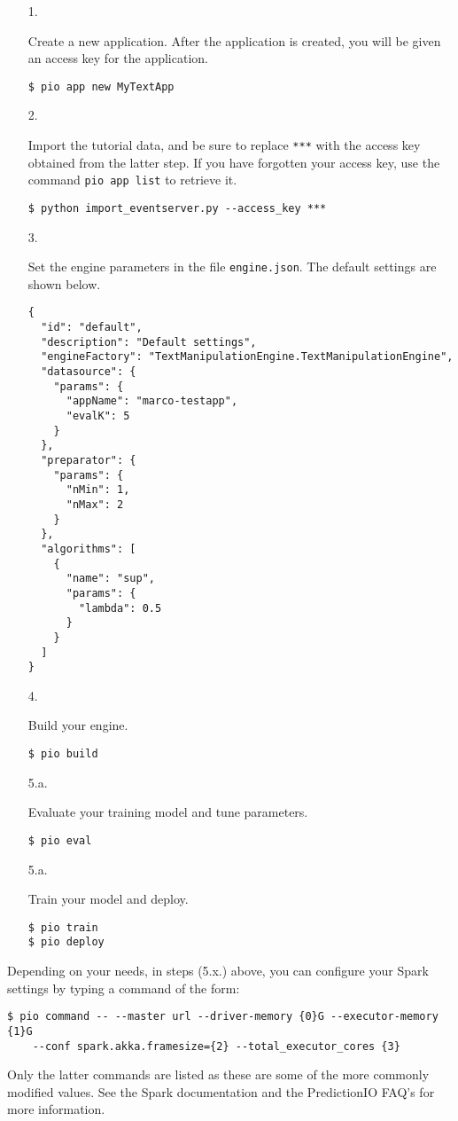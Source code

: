 \documentclass[a4paper,12pt]{article}
\renewcommand{\tt}[1]{\texttt{#1}}
\newcommand{\3}{\left}
\newcommand{\4}{\right}
\renewcommand{\-}[1]{{}^{-#1}}
\begin{document}
\begin{itemize}
\item[1.]{Create a new application. After the application is created, you will be given an access key for the application.
\begin{verbatim}
$ pio app new MyTextApp
\end{verbatim}}

\item[2.]{Import the tutorial data, and be sure to replace \tt{***} with the access key obtained from the latter step. If you have forgotten your access key, use the command \tt{pio app list} to retrieve it.
\begin{verbatim}
$ python import_eventserver.py --access_key ***
\end{verbatim}}

\item[3.]{Set the engine parameters in the file \tt{engine.json}. The default settings are shown below.

\break

\begin{verbatim}
{
  "id": "default",
  "description": "Default settings",
  "engineFactory": "TextManipulationEngine.TextManipulationEngine",
  "datasource": {
    "params": {
      "appName": "marco-testapp",
      "evalK": 5
    }
  },
  "preparator": {
    "params": {
      "nMin": 1,
      "nMax": 2
    }
  },
  "algorithms": [
    {
      "name": "sup",
      "params": {
        "lambda": 0.5
      }
    }
  ]
}
\end{verbatim}}

\item[4.]{Build your engine.
\begin{verbatim}
$ pio build
\end{verbatim}}

\item[5.a.]{Evaluate your training model and tune parameters.
\begin{verbatim}
$ pio eval
\end{verbatim}}

\item[5.a.]{Train your model and deploy.
\begin{verbatim}
$ pio train
$ pio deploy
\end{verbatim}}

\end{itemize}

Depending on your needs, in steps (5.x.) above, you can configure your Spark settings by typing a command of the form:
\begin{verbatim}
$ pio command -- --master url --driver-memory {0}G --executor-memory {1}G 
	--conf spark.akka.framesize={2} --total_executor_cores {3}
\end{verbatim}
Only the latter commands are listed as these are some of the more commonly modified values. See the Spark documentation
and the PredictionIO FAQ's 
for more information.
\end{document}

